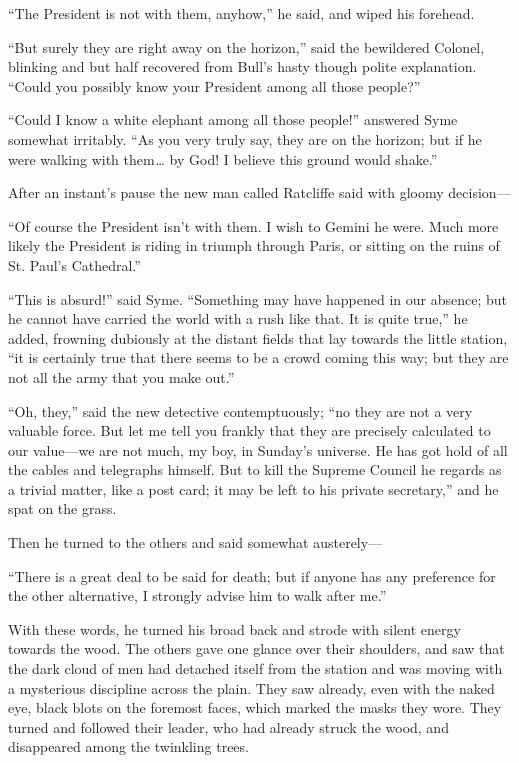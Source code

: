 “The President is not with them, anyhow,” he said, and wiped his forehead.

“But surely they are right away on the horizon,” said the bewildered Colonel, blinking and but half recovered from Bull’s hasty though polite explanation. “Could you possibly know your President among all those people?”

“Could I know a white elephant among all those people!” answered Syme somewhat irritably. “As you very truly say, they are on the horizon; but if he were walking with them⁠ ⁠… by God! I believe this ground would shake.”

After an instant’s pause the new man called Ratcliffe said with gloomy decision⁠—

“Of course the President isn’t with them. I wish to Gemini he were. Much more likely the President is riding in triumph through Paris, or sitting on the ruins of St. Paul’s Cathedral.”

“This is absurd!” said Syme. “Something may have happened in our absence; but he cannot have carried the world with a rush like that. It is quite true,” he added, frowning dubiously at the distant fields that lay towards the little station, “it is certainly true that there seems to be a crowd coming this way; but they are not all the army that you make out.”

“Oh, they,” said the new detective contemptuously; “no they are not a very valuable force. But let me tell you frankly that they are precisely calculated to our value⁠—we are not much, my boy, in Sunday’s universe. He has got hold of all the cables and telegraphs himself. But to kill the Supreme Council he regards as a trivial matter, like a post card; it may be left to his private secretary,” and he spat on the grass.

Then he turned to the others and said somewhat austerely⁠—

“There is a great deal to be said for death; but if anyone has any preference for the other alternative, I strongly advise him to walk after me.”

With these words, he turned his broad back and strode with silent energy towards the wood. The others gave one glance over their shoulders, and saw that the dark cloud of men had detached itself from the station and was moving with a mysterious discipline across the plain. They saw already, even with the naked eye, black blots on the foremost faces, which marked the masks they wore. They turned and followed their leader, who had already struck the wood, and disappeared among the twinkling trees.


